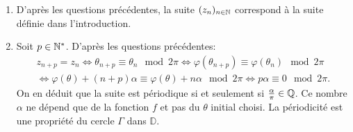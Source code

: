 \begin{enumerate}
\begin{enumerate}
  \item D'après les questions précédentes, la suite $(z_{n})_{n\in \mathbb{N}}$ correspond à la suite définie dans l'introduction.
  \item Soit $p \in \mathbb{N}^*$. D'après les questions précédentes:
\begin{multline*}
  z_{n+p} = z_n \Leftrightarrow \theta_{n+p} \equiv \theta_n \mod 2\pi
  \Leftrightarrow \varphi(\theta_{n+p}) \equiv \varphi(\theta_n) \mod 2\pi\\
  \Leftrightarrow \varphi(\theta) + (n+p)\alpha \equiv \varphi(\theta) + n\alpha \mod 2\pi
  \Leftrightarrow p\alpha \equiv 0 \mod 2\pi.
\end{multline*}
On en déduit que la suite est périodique si et seulement si $\frac{\alpha}{\pi} \in \mathbb{Q}$. Ce nombre $\alpha$ ne dépend que de la fonction $f$ et pas du $\theta$ initial choisi. La périodicité est une propriété du cercle $\Gamma$ dans $\mathbb{D}$.
\end{enumerate}

\end{enumerate}
